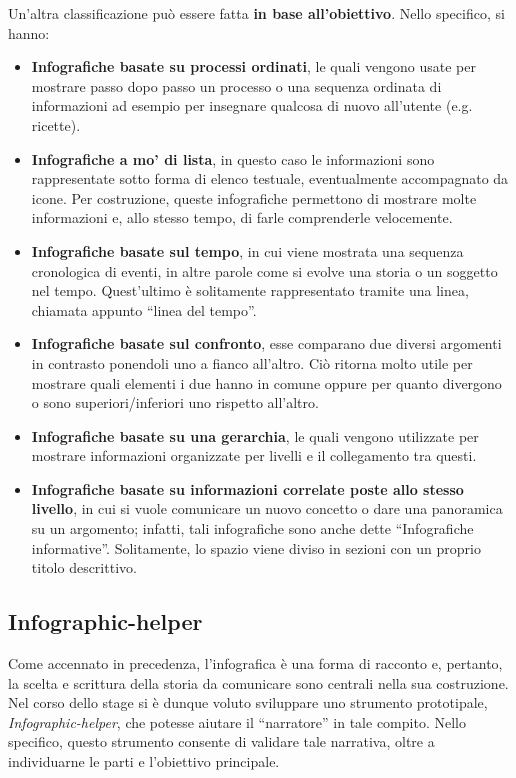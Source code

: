 \bigskip
\noindent Un'altra classificazione può essere fatta \textbf{in base all'obiettivo}. Nello specifico, si hanno:
\begin{itemize}
    \item \textbf{Infografiche basate su processi ordinati}, le quali vengono usate per mostrare passo dopo passo un processo o una 
    sequenza ordinata di informazioni ad esempio per insegnare qualcosa di nuovo all'utente (e.g. ricette).
    \item \textbf{Infografiche a mo' di lista}, in questo caso le informazioni sono rappresentate sotto forma di elenco testuale, eventualmente accompagnato da icone.
    Per costruzione, queste infografiche permettono di mostrare molte informazioni e, allo stesso tempo, di farle comprenderle velocemente.
    \item \textbf{Infografiche basate sul tempo}, in cui viene mostrata una sequenza cronologica di eventi, in altre parole come si evolve una storia o un soggetto nel tempo.
    Quest'ultimo è solitamente rappresentato tramite una linea, chiamata appunto ``linea del tempo''.
    \item \textbf{Infografiche basate sul confronto}, esse comparano due diversi argomenti in contrasto ponendoli uno a fianco all'altro.  Ciò ritorna molto utile per mostrare
    quali elementi i due hanno in comune oppure per quanto divergono o sono superiori/inferiori uno rispetto all'altro.
    \item \textbf{Infografiche basate su una gerarchia}, le quali vengono utilizzate per mostrare informazioni organizzate per livelli e il collegamento tra questi.
    \item \textbf{Infografiche basate su informazioni correlate poste allo stesso livello}, in cui si vuole comunicare un nuovo concetto o dare una panoramica su un argomento; infatti,
    tali infografiche sono anche dette ``Infografiche informative''. Solitamente, lo spazio viene diviso in sezioni con un proprio titolo descrittivo.
\end{itemize}


\subsection{Infographic-helper}
Come accennato in precedenza, l'infografica è una forma di racconto e, pertanto, la scelta e scrittura della storia da comunicare sono centrali nella sua costruzione.
Nel corso dello stage si è dunque voluto sviluppare uno strumento prototipale, \emph{Infographic-helper}, che potesse aiutare il ``narratore'' in tale compito.
Nello specifico, questo strumento consente di validare tale narrativa, oltre a individuarne le parti e l'obiettivo principale.

